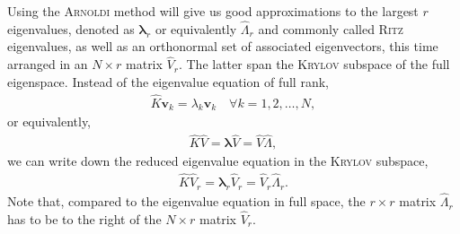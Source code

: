 \documentclass[a4paper, twoside, 10pt, english]{article}
\numberwithin{equation}{section}
\let\vec\symbf
\begin{document}
Using the \textsc{Arnoldi} method will give us good approximations to the largest $r$ eigenvalues, denoted as $\vec{\lambda}_{r}$ or equivalently $\hat{\Lambda}_{r}$ and commonly called \textsc{Ritz} eigenvalues, as well as an orthonormal set of associated eigenvectors, this time arranged in an $N \times r$ matrix $\hat{V}_{r}$. The latter span the \textsc{Krylov} subspace of the full eigenspace. Instead of the eigenvalue equation of full rank,
\begin{gather}
  \hat{K} \vec{v}_{k} = \lambda_{k} \vec{v}_{k} \quad \forall k = 1, 2, \dotsc, N,
\end{gather}
or equivalently,
\begin{gather}
  \hat{K} \hat{V} = \vec{\lambda} \hat{V} = \hat{V} \hat{\Lambda},
\end{gather}
we can write down the reduced eigenvalue equation in the \textsc{Krylov} subspace,
\begin{gather}
  \hat{K} \hat{V}_{r} = \vec{\lambda}_{r} \hat{V}_{r} = \hat{V}_{r} \hat{\Lambda}_{r}. \label{eq:reduced_eigvals}
\end{gather}
Note that, compared to the eigenvalue equation in full space, the $r \times r$ matrix $\hat{\Lambda}_{r}$ has to be to the right of the $N \times r$ matrix $\hat{V}_{r}$.
\end{document}
